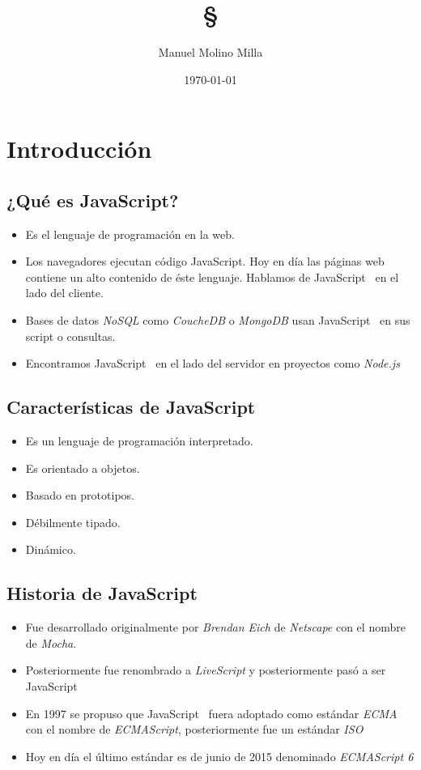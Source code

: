 \documentclass[4paper]{article}
\author{Manuel Molino Milla}
\title{\textbf{\S}}
\date{\today}
\newcommand{\J}{JavaScript}
\begin{document}
\maketitle 
\tableofcontents
\newpage

\section{Introducción}
\subsection{¿Qué es \J?}
\begin{itemize}
\item Es el lenguaje de programación en la web.
\item Los navegadores ejecutan código \J . Hoy en día las páginas web contiene un alto contenido de éste lenguaje. Hablamos de \J ~ en el lado del cliente. 
\item Bases de datos \textit{NoSQL} como \textit{CoucheDB} o \textit{MongoDB} usan \J ~ en sus script o consultas.
\item Encontramos \J ~ en el lado del servidor en proyectos como \textit{Node.js}
\end{itemize}

\subsection{Características de \J}
\begin{itemize}
\item Es un lenguaje de programación interpretado.
\item Es orientado a objetos.
\item Basado en prototipos.
\item Débilmente tipado.
\item Dinámico.
\end{itemize}

\subsection{Historia de \J}
\begin{itemize}
\item Fue desarrollado originalmente por \textit{Brendan Eich} de \textit{Netscape} con el nombre de \textit{Mocha}.
\item Posteriormente fue renombrado a \textit{LiveScript} y posteriormente pasó a ser \J
\item En 1997 se propuso que \J ~ fuera adoptado como estándar \emph{ECMA} con el nombre de \emph{ECMAScript}, posteriormente fue un estándar \emph{ISO}
\item Hoy en día el último estándar es de junio de 2015 denominado \textit{ECMAScript 6}
\end{itemize}
\end{document}
